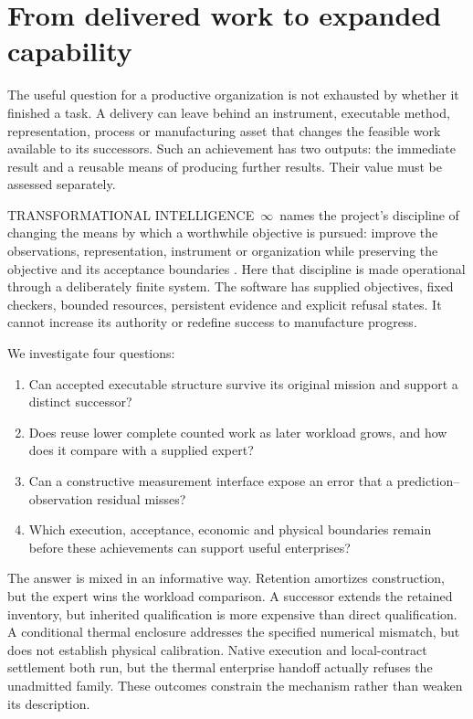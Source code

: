 \documentclass[11pt,a4paper]{article}
\newcommand{\TI}{TRANSFORMATIONAL INTELLIGENCE~\(\infty\)}
\begin{document}
\section{From delivered work to expanded capability}\label{sec:introduction}
The useful question for a productive organization is not exhausted by whether it finished a task. A delivery can leave behind an instrument, executable method, representation, process or manufacturing asset that changes the feasible work available to its successors. Such an achievement has two outputs: the immediate result and a reusable means of producing further results. Their value must be assessed separately.

\TI\ names the project's discipline of changing the means by which a worthwhile objective is pursued: improve the observations, representation, instrument or organization while preserving the objective and its acceptance boundaries \cite{boucher2026transformational}. Here that discipline is made operational through a deliberately finite system. The software has supplied objectives, fixed checkers, bounded resources, persistent evidence and explicit refusal states. It cannot increase its authority or redefine success to manufacture progress.

We investigate four questions:
\begin{enumerate}
\item Can accepted executable structure survive its original mission and support a distinct successor?
\item Does reuse lower complete counted work as later workload grows, and how does it compare with a supplied expert?
\item Can a constructive measurement interface expose an error that a prediction--observation residual misses?
\item Which execution, acceptance, economic and physical boundaries remain before these achievements can support useful enterprises?
\end{enumerate}

The answer is mixed in an informative way. Retention amortizes construction, but the expert wins the workload comparison. A successor extends the retained inventory, but inherited qualification is more expensive than direct qualification. A conditional thermal enclosure addresses the specified numerical mismatch, but does not establish physical calibration. Native execution and local-contract settlement both run, but the thermal enterprise handoff actually refuses the unadmitted family. These outcomes constrain the mechanism rather than weaken its description.
\end{document}
